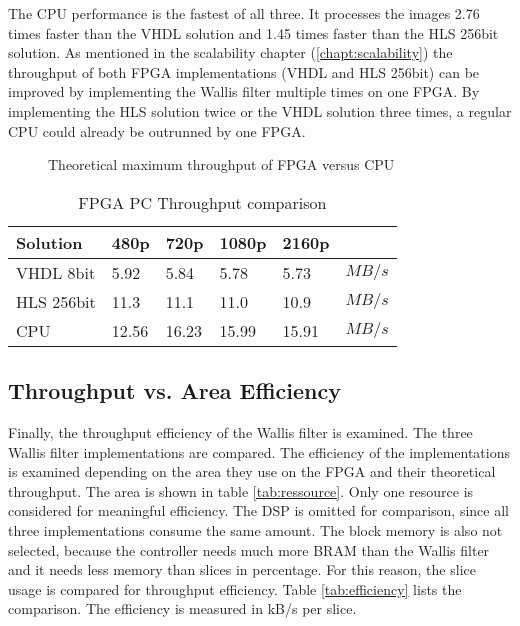 The CPU performance is the fastest of all three. It processes the images 2.76
times faster than the VHDL solution and 1.45 times faster than the HLS 256bit
solution. As mentioned in the scalability chapter (\ref{chapt:scalability}) the
throughput of both FPGA implementations (VHDL and HLS 256bit) can be improved by
implementing the Wallis filter multiple times on one FPGA. By implementing the
HLS solution twice or the VHDL solution three times, a regular CPU could already
be outrunned by one FPGA.

\begin{figure}[b!]
    \centering
    \begin{adjustbox}{max width=\linewidth}
        
    \end{adjustbox}
    \caption{Theoretical maximum throughput of FPGA versus CPU}
    \label{fig:theoreticalmax}
\end{figure}

\begin{table}[b!]
    \centering
    \begin{tabular}{l l l l l l}
        \toprule
        Solution & 480p & 720p & 1080p & 2160p & \\
        \midrule
        VHDL 8bit       & 5.92  & 5.84  & 5.78  & 5.73  & $MB/s$ \\
        HLS  256bit & 11.3  & 11.1  & 11.0  & 10.9  & $MB/s$ \\
        CPU        & 12.56 & 16.23 & 15.99 & 15.91 & $MB/s$ \\
        \bottomrule
    \end{tabular}
    \caption{FPGA PC Throughput comparison}
    \label{tab:throughputcompare}
\end{table}

\subsection{Throughput vs. Area Efficiency}
Finally, the throughput efficiency of the Wallis filter is examined. The three
Wallis filter implementations are compared. The efficiency of the
implementations is examined depending on the area they use on the FPGA
and their theoretical throughput. The area is shown in table 
\ref{tab:ressource}. Only one resource is considered for meaningful efficiency.
The DSP is omitted for comparison, since all three implementations consume the
same amount. The block memory is also not selected, because the controller needs
much more BRAM than the Wallis filter and it needs less memory than slices in
percentage. For this reason, the slice usage is compared for throughput
efficiency. Table \ref{tab:efficiency} lists the comparison. The efficiency is
measured in kB/s per slice.
\\

